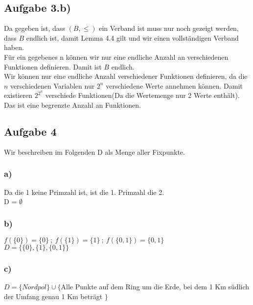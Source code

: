 \documentclass[10pt,a4paper,german,landscape,fleqn]{article} \usepackage[utf8]{inputenc} %
\begin{document}
\subsection*{Aufgabe 3.b)}
Da gegeben ist, dass $(B,\le)$ ein Verband ist muss nur noch gezeigt werden, dass
$B$ endlich ist, damit Lemma 4.4 gilt und wir einen vollständigen Verband haben. \\
Für ein gegebenes n können wir nur eine endliche Anzahl an verschiedenen Funktionen definieren. Damit ist $B$ endlich. \\
Wir können nur eine endliche Anzahl verschiedener Funktionen definieren, da die $n$ verschiedenen Variablen nur $2^n$ verschiedene Werte annehmen können. Damit existieren $2^{2^n}$ verschiede Funktionen(Da die Wertemenge nur 2 Werte enthält). Das ist eine begrenzte Anzahl an Funktionen.

\subsection*{Aufgabe 4}
Wir beschreiben im Folgenden D als Menge aller Fixpunkte.
\subsubsection*{a)}
Da die 1 keine Primzahl ist, ist die 1. Primzahl die 2.\\
D = $\emptyset$
\subsubsection*{b)}
$f(\{0\})=\{0\} \ ; \ f(\{1\})=\{1\} \ ; \ f(\{0,1\})=\{0,1\}$\\
$D=\{ \{0\},\{1\},\{0,1\}\}$\\
\subsubsection*{c)}
$D=\{Nordpol\} \cup \{$Alle Punkte auf dem Ring um die Erde, bei dem 1 Km südlich der Umfang genau 1 Km beträgt $\} $\\
\end{document}
